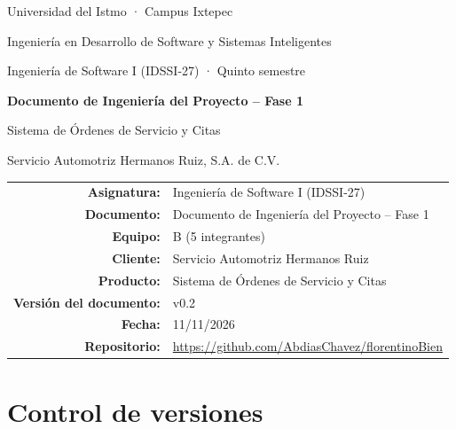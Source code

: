 \newcommand{\versiondoc}{0.2}
\newcommand{\fechadoc}{11/11/2026}




\begin{titlepage}
\centering
{\large Universidad del Istmo · Campus Ixtepec\par}
Ingeniería en Desarrollo de Software y Sistemas Inteligentes\par
Ingeniería de Software I (IDSSI-27) · Quinto semestre\par
\vspace{3cm}
{\LARGE\bfseries Documento de Ingeniería del Proyecto -- Fase 1\par}
\vspace{1cm}
{\Large Sistema de Órdenes de Servicio y Citas\par}
\vspace{0.5cm}
Servicio Automotriz Hermanos Ruiz, S.A. de C.V.\par
\vfill
\begin{tabular}{rl}
\textbf{Asignatura:} & Ingeniería de Software I (IDSSI-27)\\
\textbf{Documento:} & Documento de Ingeniería del Proyecto -- Fase 1\\
\textbf{Equipo:} & B (5 integrantes)\\
\textbf{Cliente:} & Servicio Automotriz Hermanos Ruiz\\
\textbf{Producto:} & Sistema de Órdenes de Servicio y Citas\\
\textbf{Versión del documento:} & v\versiondoc\\
\textbf{Fecha:} & \fechadoc\\
\textbf{Repositorio:} & \url{https://github.com/AbdiasChavez/florentinoBien}\\
\end{tabular}
\end{titlepage}

\section*{Control de versiones}


